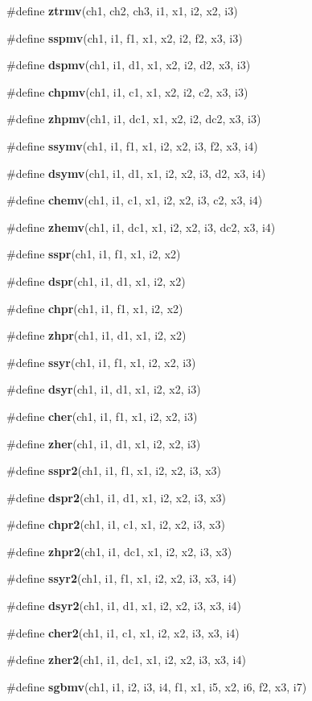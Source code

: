 \begin{CompactItemize}
\item 
\#define {\bf ztrmv}(ch1, ch2, ch3, i1, x1, i2, x2, i3)
\item 
\#define {\bf sspmv}(ch1, i1, f1, x1, x2, i2, f2, x3, i3)
\item 
\#define {\bf dspmv}(ch1, i1, d1, x1, x2, i2, d2, x3, i3)
\item 
\#define {\bf chpmv}(ch1, i1, c1, x1, x2, i2, c2, x3, i3)
\item 
\#define {\bf zhpmv}(ch1, i1, dc1, x1, x2, i2, dc2, x3, i3)
\item 
\#define {\bf ssymv}(ch1, i1, f1, x1, i2, x2, i3, f2, x3, i4)
\item 
\#define {\bf dsymv}(ch1, i1, d1, x1, i2, x2, i3, d2, x3, i4)
\item 
\#define {\bf chemv}(ch1, i1, c1, x1, i2, x2, i3, c2, x3, i4)
\item 
\#define {\bf zhemv}(ch1, i1, dc1, x1, i2, x2, i3, dc2, x3, i4)
\item 
\#define {\bf sspr}(ch1, i1, f1, x1, i2, x2)
\item 
\#define {\bf dspr}(ch1, i1, d1, x1, i2, x2)
\item 
\#define {\bf chpr}(ch1, i1, f1, x1, i2, x2)
\item 
\#define {\bf zhpr}(ch1, i1, d1, x1, i2, x2)
\item 
\#define {\bf ssyr}(ch1, i1, f1, x1, i2, x2, i3)
\item 
\#define {\bf dsyr}(ch1, i1, d1, x1, i2, x2, i3)
\item 
\#define {\bf cher}(ch1, i1, f1, x1, i2, x2, i3)
\item 
\#define {\bf zher}(ch1, i1, d1, x1, i2, x2, i3)
\item 
\#define {\bf sspr2}(ch1, i1, f1, x1, i2, x2, i3, x3)
\item 
\#define {\bf dspr2}(ch1, i1, d1, x1, i2, x2, i3, x3)
\item 
\#define {\bf chpr2}(ch1, i1, c1, x1, i2, x2, i3, x3)
\item 
\#define {\bf zhpr2}(ch1, i1, dc1, x1, i2, x2, i3, x3)
\item 
\#define {\bf ssyr2}(ch1, i1, f1, x1, i2, x2, i3, x3, i4)
\item 
\#define {\bf dsyr2}(ch1, i1, d1, x1, i2, x2, i3, x3, i4)
\item 
\#define {\bf cher2}(ch1, i1, c1, x1, i2, x2, i3, x3, i4)
\item 
\#define {\bf zher2}(ch1, i1, dc1, x1, i2, x2, i3, x3, i4)
\item 
\#define {\bf sgbmv}(ch1, i1, i2, i3, i4, f1, x1, i5, x2, i6, f2, x3, i7)

\end{CompactItemize}
